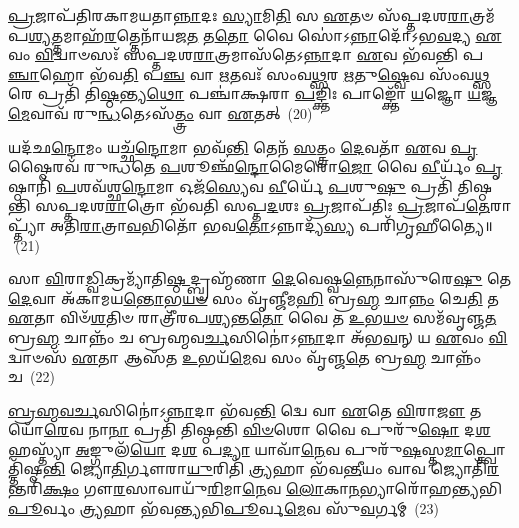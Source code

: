 {\anuvakamend[{\-\ul{𑌗}\-\-\ul{𑌚𑍍𑌛}\-\-\ul{𑌨𑍍𑌤𑍍𑌯}\-\-\ul{𑌗𑍍𑌨𑌿}\-𑌷𑍍𑌟𑍁𑌤𑌾᳴ \ul{𑌪𑌾}\-𑌪𑍍𑌮𑌾\-\ul{𑌨}\-𑌨𑍍𑌨𑌿\-\ul{𑌰}\-𑌨𑍍𑌤𑌰𑌿᳴𑌕𑍍𑌷\-\ul{𑌲𑍍𑌲𑍋𑌁}\-𑌕𑌂 \ul{𑌪𑍍𑌰}\-𑌜𑌾\-\ul{𑌯𑍈} 𑌦𑍍𑌵𑍇 𑌚᳴}]}%

\-\ul{𑌪𑍍𑌰}\-𑌜𑌾𑌪᳴𑌤𑌿𑌰𑌕𑌾𑌮𑌯𑌤𑌾\-\ul{𑌨𑍍𑌨𑌾}\-𑌦𑌃 \ul{𑌸𑍍𑌯𑌾}\-𑌮𑌿\-\ul{𑌤𑌿} 𑌸 \ul{𑌏}\-𑌤𑍞 𑌸᳴𑌪𑍍𑌤𑌦𑌶\-\ul{𑌰𑌾}\-𑌤𑍍𑌰𑌮᳴𑌪\-\ul{𑌶𑍍𑌯}\-𑌤𑍍𑌤𑌮𑌾𑌹᳴\-\ul{𑌰}\-𑌤𑍍𑌤𑍇𑌨𑌾᳴𑌯𑌜\-\ul{𑌤} 𑌤\-\ul{𑌤𑍋} 𑌵𑍈 𑌸𑍋॑\-𑌽\-\ul{𑌨𑍍𑌨𑌾}\-𑌦𑍋᳴\-𑌽𑌭\-\ul{𑌵}\-𑌦𑍍𑌯 \ul{𑌏}\-𑌵𑌂 \ul{𑌵𑌿}\-𑌦𑍍𑌵𑌾𑍞𑌸𑌃᳴ 𑌸𑌪𑍍𑌤𑌦𑌶\-\ul{𑌰𑌾}\-𑌤𑍍𑌰𑌮𑌾𑌸᳴𑌤𑍇\-𑌽\-\ul{𑌨𑍍𑌨𑌾}\-𑌦𑌾 \ul{𑌏}\-𑌵 𑌭᳴𑌵𑌨𑍍𑌤𑌿 𑌪\-\ul{𑌞𑍍𑌚𑌾}\-𑌹𑍋 𑌭᳴𑌵\-\ul{𑌤𑌿} 𑌪\-\ul{𑌞𑍍𑌚} 𑌵𑌾 \ul{𑌋}\-𑌤𑌵𑌃᳴ 𑌸𑌂𑌵\-\ul{𑌥𑍍𑌸}\-𑌰 \ul{𑌋}\-𑌤𑍁\-\ul{𑌷𑍍𑌵𑍇}\-𑌵 𑌸𑌂᳴𑌵\-\ul{𑌥𑍍𑌸}\-𑌰𑍇 𑌪𑍍𑌰𑌤𑌿᳴ 𑌤𑌿\-\ul{𑌷𑍍𑌠}\-𑌨𑍍𑌤𑍍𑌯\-\ul{𑌥𑍋} 𑌪𑌞𑍍𑌚𑌾॑𑌕𑍍𑌷𑌰𑌾 \ul{𑌪}\-𑌙𑍍𑌕𑍍𑌤𑌿𑌃 𑌪𑌾𑌙𑍍𑌕𑍍𑌤𑍋᳴ \ul{𑌯}\-𑌜𑍍𑌞𑍋 \ul{𑌯}\-𑌜𑍍𑌞\-\ul{𑌮𑍇}\-𑌵𑌾𑌵᳴ 𑌰𑍁\-\ul{𑌨𑍍𑌧}\-𑌤𑍇\-𑌽𑌸᳴\-\ul{𑌤𑍍𑌤𑍍𑌰𑌂} 𑌵𑌾 \ul{𑌏}\-𑌤𑌤𑍍~(20)

𑌯𑌦᳴𑌛\-\ul{𑌨𑍍𑌦𑍋}\-𑌮𑌂 𑌯𑌚𑍍𑌛᳴\-\ul{𑌨𑍍𑌦𑍋}\-𑌮𑌾 𑌭𑌵᳴\-\ul{𑌨𑍍𑌤𑌿} 𑌤𑍇𑌨᳴ \ul{𑌸}\-𑌤𑍍𑌤𑍍𑌰𑌂 \ul{𑌦𑍇}\-𑌵𑌤𑌾᳴ \ul{𑌏}\-𑌵 \ul{𑌪𑍃}\-𑌷𑍍𑌠𑍈𑌰𑌵᳴ 𑌰𑍁𑌨𑍍𑌧𑌤𑍇 \ul{𑌪}\-𑌶𑍂𑌞𑍍𑌛᳴\-\ul{𑌨𑍍𑌦𑍋}\-𑌮𑍈𑌰𑍋\-\ul{𑌜𑍋} 𑌵𑍈 \ul{𑌵𑍀}\-𑌰𑍍𑌯𑌂᳴ \ul{𑌪𑍃}\-𑌷𑍍𑌠𑌾𑌨𑌿᳴ \ul{𑌪}\-𑌶𑌵᳴𑌶𑍍𑌛\-\ul{𑌨𑍍𑌦𑍋}\-𑌮𑌾 𑌓𑌜᳴\-\ul{𑌸𑍍𑌯𑍇}\-𑌵 \ul{𑌵𑍀}\-𑌰𑍍𑌯𑍇᳴ \ul{𑌪}\-𑌶𑍁\-\ul{𑌷𑍁} 𑌪𑍍𑌰𑌤𑌿᳴ 𑌤𑌿𑌷𑍍𑌠𑌨𑍍𑌤𑌿 𑌸𑌪𑍍𑌤𑌦𑌶\-\ul{𑌰𑌾}\-𑌤𑍍𑌰𑍋 𑌭᳴𑌵𑌤𑌿 𑌸𑌪𑍍𑌤\-\ul{𑌦}\-𑌶𑌃 \ul{𑌪𑍍𑌰}\-𑌜𑌾𑌪᳴𑌤𑌿𑌃 \ul{𑌪𑍍𑌰}\-𑌜𑌾𑌪᳴\-\ul{𑌤𑍇}\-𑌰𑌾𑌪𑍍𑌤𑍍𑌯𑌾᳴ 𑌅𑌤𑌿\-\ul{𑌰𑌾}\-𑌤𑍍𑌰𑌾\-\ul{𑌵}\-𑌭𑌿𑌤𑍋᳴ 𑌭𑌵\-\ul{𑌤𑍋}\-\-𑌽𑌨𑍍𑌨𑌾𑌦𑍍𑌯᳴\-\ul{𑌸𑍍𑌯} 𑌪𑌰𑌿᳴𑌗𑍃𑌹𑍀𑌤𑍍𑌯𑍈॥~(21)

{\anuvakamend[{\-\ul{𑌏}\-𑌤\-\ul{𑌥𑍍𑌸}\-𑌪𑍍𑌤𑌤𑍍𑌰𑌿𑍟᳴𑌶𑍍𑌚𑌚𑍍𑌚}]}%

𑌸𑌾 \ul{𑌵𑌿}\-𑌰𑌾\-\ul{𑌡𑍍𑌵𑌿}\-𑌕𑍍𑌰𑌮𑍍𑌯𑌾᳴𑌤𑌿\-\ul{𑌷𑍍𑌠}\-𑌦𑍍𑌬𑍍𑌰𑌹𑍍𑌮᳴𑌣𑌾 \ul{𑌦𑍇}\-𑌵𑍇𑌷𑍍𑌵\-\ul{𑌨𑍍𑌨𑍇}\-𑌨𑌾𑌸𑍁᳴𑌰𑍇\-\ul{𑌷𑍁} 𑌤𑍇 \ul{𑌦𑍇}\-𑌵𑌾 𑌅᳴𑌕𑌾𑌮𑌯\-\ul{𑌨𑍍𑌤𑍋}\-𑌭\-\ul{𑌯}\-\-\ul{𑍞} 𑌸𑌂 𑌵𑍃᳴𑌞𑍍𑌜𑍀𑌮\-\ul{𑌹𑌿} 𑌬𑍍𑌰\-\ul{𑌹𑍍𑌮} 𑌚𑌾\-\ul{𑌨𑍍𑌨𑌂} 𑌚𑍇\-\ul{𑌤𑌿} 𑌤 \ul{𑌏}\-𑌤𑌾 𑌵𑌿𑍞᳴\-\ul{𑌶}\-𑌤𑌿𑍞 𑌰𑌾𑌤𑍍𑌰𑍀᳴𑌰𑌪\-\ul{𑌶𑍍𑌯}\-𑌨𑍍𑌤\-\ul{𑌤𑍋} 𑌵𑍈 𑌤 \ul{𑌉}\-𑌭\-\ul{𑌯}\-\-\ul{𑍞} 𑌸𑌮᳴𑌵𑍃𑌞𑍍𑌜\-\ul{𑌤} 𑌬𑍍𑌰\-\ul{𑌹𑍍𑌮} 𑌚𑌾𑌨𑍍𑌨𑌂᳴ 𑌚 𑌬𑍍𑌰𑌹𑍍𑌮𑌵\-\ul{𑌰𑍍𑌚}\-𑌸𑌿𑌨𑍋॑\-𑌽\-\ul{𑌨𑍍𑌨𑌾}\-𑌦𑌾 𑌅᳴𑌭\-\ul{𑌵}\-𑌨𑍍 𑌯 \ul{𑌏}\-𑌵𑌂 \ul{𑌵𑌿}\-𑌦𑍍𑌵𑌾𑍞𑌸᳴ \ul{𑌏}\-𑌤𑌾 𑌆𑌸᳴𑌤 \ul{𑌉}\-𑌭𑌯᳴\-\ul{𑌮𑍇}\-𑌵 𑌸𑌂 𑌵𑍃᳴𑌞𑍍𑌜\-\ul{𑌤𑍇} 𑌬𑍍𑌰\-\ul{𑌹𑍍𑌮} 𑌚𑌾𑌨𑍍𑌨𑌂᳴ 𑌚~(22)

\-\ul{𑌬𑍍𑌰}\-\-\ul{𑌹𑍍𑌮}\-\-\ul{𑌵}\-\-\ul{𑌰𑍍𑌚}\-𑌸𑌿𑌨𑍋॑\-𑌽\-\ul{𑌨𑍍𑌨𑌾}\-𑌦𑌾 𑌭᳴𑌵\-\ul{𑌨𑍍𑌤𑌿} 𑌦𑍍𑌵𑍇 𑌵𑌾 \ul{𑌏}\-𑌤𑍇 \ul{𑌵𑌿}\-𑌰𑌾\-\ul{𑌜𑍗} 𑌤𑌯𑍋᳴\-\ul{𑌰𑍇}\-𑌵 𑌨𑌾\-\ul{𑌨𑌾} 𑌪𑍍𑌰𑌤𑌿᳴ 𑌤𑌿𑌷𑍍𑌠𑌨𑍍𑌤𑌿 \ul{𑌵𑌿}\-\-\ul{𑍞}\-𑌶𑍋 𑌵𑍈 𑌪𑍁𑌰𑍁᳴\-\ul{𑌷𑍋} 𑌦\-\ul{𑌶} 𑌹𑌸𑍍𑌤𑍍𑌯𑌾᳴ \ul{𑌅}\-𑌙𑍍𑌗𑍁𑌲᳴\-\ul{𑌯𑍋} 𑌦\-\ul{𑌶} 𑌪\-\ul{𑌦𑍍𑌯𑌾} 𑌯𑌾𑌵𑌾᳴\-\ul{𑌨𑍇}\-𑌵 𑌪𑍁𑌰𑍁᳴\-\ul{𑌷}\-𑌸𑍍𑌤\-\ul{𑌮𑌾}\-𑌪𑍍𑌤𑍍𑌵𑍋𑌤𑍍𑌤𑌿᳴𑌷𑍍𑌠\-\ul{𑌨𑍍𑌤𑌿} 𑌜𑍍𑌯𑍋\-\ul{𑌤𑌿}\-𑌰𑍍𑌗𑍗𑌰𑌾\-\ul{𑌯𑍁}\-𑌰𑌿𑌤𑌿᳴ \ul{𑌤𑍍𑌰𑍍𑌯}\-𑌹𑌾 𑌭᳴𑌵\-\ul{𑌨𑍍𑌤𑍀}\-𑌯𑌂 𑌵𑌾𑌵 𑌜𑍍𑌯𑍋𑌤𑌿᳴\-\ul{𑌰}\-𑌨𑍍𑌤𑌰𑌿᳴\-\ul{𑌕𑍍𑌷𑌂} 𑌗𑍗\-\ul{𑌰}\-𑌸𑌾𑌵𑌾𑌯𑍁᳴\-\ul{𑌰𑌿}\-𑌮𑌾\-\ul{𑌨𑍇}\-𑌵 \ul{𑌲𑍋}\-𑌕𑌾\-\ul{𑌨}\-𑌭𑍍𑌯𑌾𑌰𑍋᳴𑌹𑌨𑍍𑌤𑍍𑌯𑌭𑌿\-\ul{𑌪𑍂}\-𑌰𑍍𑌵𑌂 \ul{𑌤𑍍𑌰𑍍𑌯}\-𑌹𑌾 𑌭᳴𑌵𑌨𑍍𑌤𑍍𑌯𑌭𑌿\-\ul{𑌪𑍂}\-𑌰𑍍𑌵\-\ul{𑌮𑍇}\-𑌵 𑌸𑍁᳴\-\ul{𑌵}\-𑌰𑍍𑌗𑌮𑍍~(23)

